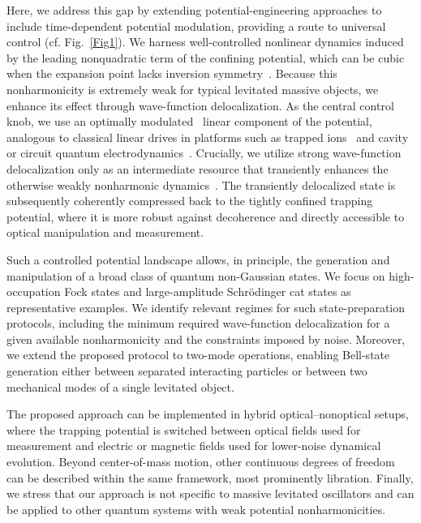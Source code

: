 \documentclass[reprint,prx,footinbib,floatfix,twocolumn,longbibliography,superscriptaddress]{revtex4-2}
\begin{document}
Here, we address this gap by extending potential-engineering approaches to include time-dependent potential modulation, providing a route to universal control (cf. Fig.~\ref{Fig1}).
We harness well-controlled nonlinear dynamics induced by the leading nonquadratic term of the confining potential, which can be cubic when the expansion point lacks inversion symmetry~\cite{Rakhubovsky2021,Neumeier2024}.
Because this nonharmonicity is extremely weak for typical levitated massive objects, we enhance its effect through wave-function delocalization.
As the central control knob, we use an optimally modulated~\cite{Grochowski2025a,Kendell2024} linear component of the potential, analogous to classical linear drives in platforms such as trapped ions~\cite{Leibfried2003a} and cavity or circuit quantum electrodynamics~\cite{Schuster2005,Devoret2013}.
Crucially, we utilize strong wave-function delocalization only as an intermediate resource that transiently enhances the otherwise weakly nonharmonic dynamics~\cite{Rosiek2024}.
The transiently delocalized state is subsequently coherently compressed back to the tightly confined trapping potential, where it is more robust against decoherence and directly accessible to optical manipulation and measurement.

Such a controlled potential landscape allows, in principle, the generation and manipulation of a broad class of quantum non-Gaussian states.
We focus on high-occupation Fock states and large-amplitude Schrödinger cat states as representative examples.
We identify relevant regimes for such state-preparation protocols, including the minimum required wave-function delocalization for a given available nonharmonicity and the constraints imposed by noise.
Moreover, we extend the proposed protocol to two-mode operations, enabling Bell-state generation either between separated interacting particles or between two mechanical modes of a single levitated object.

The proposed approach can be implemented in hybrid optical–nonoptical setups, where the trapping potential is switched between optical fields used for measurement and electric or magnetic fields used for lower-noise dynamical evolution.
Beyond center-of-mass motion, other continuous degrees of freedom can be described within the same framework, most prominently libration.
Finally, we stress that our approach is not specific to massive levitated oscillators and can be applied to other quantum systems with weak potential nonharmonicities.
\end{document}
